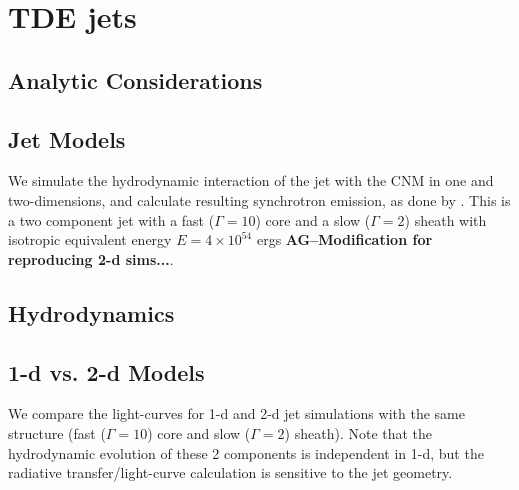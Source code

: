 \documentclass[usenatbib,fleqn]{mnras}
\newcommand{\Mbh}[1][]{M_{\bullet#1}}
\begin{document}


\section{TDE jets}
\label{sec:jet}

\subsection{Analytic Considerations}
\label{sec:analytic}

\subsection{Jet Models}


We simulate the hydrodynamic interaction of the jet with the CNM in
 one and two-dimensions, and calculate resulting synchrotron emission,
 as done by \citet{Mimica+2015}.  This is a two component jet with a fast
 ($\Gamma=10$) core and a slow ($\Gamma=2$) sheath with isotropic
 equivalent energy $E=4 \times 10^{54}$ ergs {\bf AG--Modification for
   reproducing 2-d sims...}.
\subsection{Hydrodynamics}

\subsection{1-d vs. 2-d Models}
\label{sec:2d}
We compare the light-curves for 1-d and 2-d jet simulations with the
same structure (fast ($\Gamma=10$) core and slow ($\Gamma=2$)
sheath). Note that the hydrodynamic evolution of these 2 components is
independent in 1-d, but the radiative transfer/light-curve calculation
is sensitive to the jet geometry.
\end{document}
